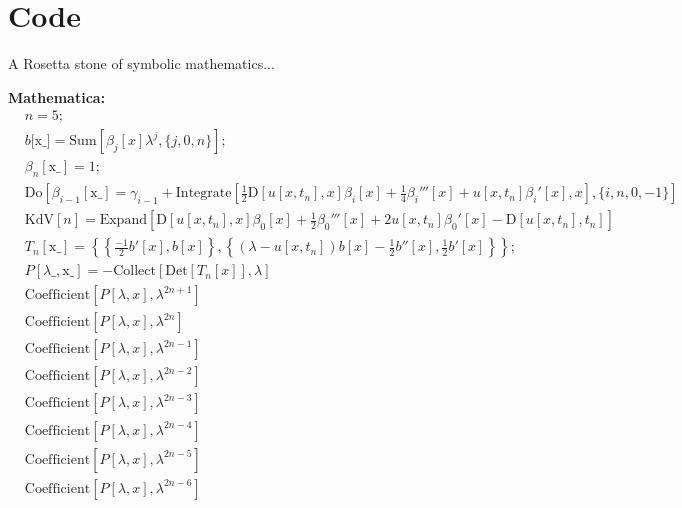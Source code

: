\documentclass[12pt, a4paper]{article}
\begin{document}
\section{Code}\label{code}



A Rosetta stone of symbolic mathematics...

\textbf{Mathematica:}
\begin{align*}
&n=5;\\
&b\text{[x\_}]=\text{Sum}\left[\beta _j[x]\lambda ^j,\{j,0,n\}\right];\\
&\beta _n[\text{x\_}]=1;\\
&\text{Do}\left[\beta _{i-1}[\text{x$\_$}]=\gamma _{i-1}+\text{Integrate}\left[\frac{1}{2}\text{D}\left[u\left[x,t_n\right],x\right]\beta _i[x]+\frac{1}{4}\beta _i'''[x]+u\left[x,t_n\right]\beta _i'[x],x\right],\{i,n,0,-1\}\right]\\
&\text{KdV}[n]=\text{Expand}\left[\text{D}\left[u\left[x,t_n\right],x\right]\beta _0[x]+\frac{1}{2}\beta _0'''[x]+2u\left[x,t_n\right]\beta _0'[x]- \text{D}\left[u\left[x,t_n\right],t_n\right]\right]\\
&T_n[\text{x$\_$}]=\left\{\left\{\frac{-1}{2}b'[x],b[x]\right\},\left\{\left(\lambda -u\left[x,t_n\right]\right)b[x]-\frac{1}{2}b''[x],\frac{1}{2}b'[x]\right\}\right\};\\
&P[\lambda \_,\text{x$\_$}]=-\text{Collect}\left[\text{Det}\left[T_n[x]\right],\lambda \right]\\
&\text{Coefficient}\left[P[\lambda ,x],\lambda ^{2n+1}\right]\\
&\text{Coefficient}\left[P[\lambda ,x],\lambda ^{2n}\right]\\
&\text{Coefficient}\left[P[\lambda ,x],\lambda ^{2n-1}\right]\\
&\text{Coefficient}\left[P[\lambda ,x],\lambda ^{2n-2}\right]\\
&\text{Coefficient}\left[P[\lambda ,x],\lambda ^{2n-3}\right]\\
&\text{Coefficient}\left[P[\lambda ,x],\lambda ^{2n-4}\right]\\
&\text{Coefficient}\left[P[\lambda ,x],\lambda ^{2n-5}\right]\\
&\text{Coefficient}\left[P[\lambda ,x],\lambda ^{2n-6}\right]\\
\end{align*}
\end{document}
